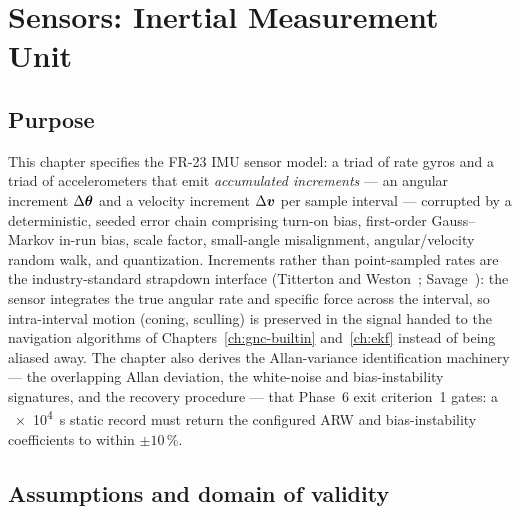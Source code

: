 \chapter{Sensors: Inertial Measurement Unit}
\label{ch:sensors-imu}

\section{Purpose}
\label{sec:imu:purpose}

This chapter specifies the FR-23 IMU sensor model: a triad of rate gyros
and a triad of accelerometers that emit \emph{accumulated increments} ---
an angular increment $\Delta\bm{\theta}$ and a velocity increment
$\Delta\bm{v}$ per sample interval --- corrupted by a deterministic,
seeded error chain comprising turn-on bias, first-order Gauss--Markov
in-run bias, scale factor, small-angle misalignment, angular/velocity
random walk, and quantization. Increments rather than point-sampled rates
are the industry-standard strapdown interface (Titterton and
Weston~\cite{titterton2004}; Savage~\cite{savage1998a}): the sensor
integrates the true angular rate and specific force across the interval,
so intra-interval motion (coning, sculling) is preserved in the signal
handed to the navigation algorithms of Chapters~\ref{ch:gnc-builtin}
and~\ref{ch:ekf} instead of being aliased away. The chapter also derives
the Allan-variance identification machinery --- the overlapping Allan
deviation, the white-noise and bias-instability signatures, and the
recovery procedure --- that Phase~6 exit criterion~1 gates: a
\qty{e4}{\second} static record must return the configured ARW and
bias-instability coefficients to within $\pm 10\,\%$.

\section{Assumptions and domain of validity}
\label{sec:imu:domain}

